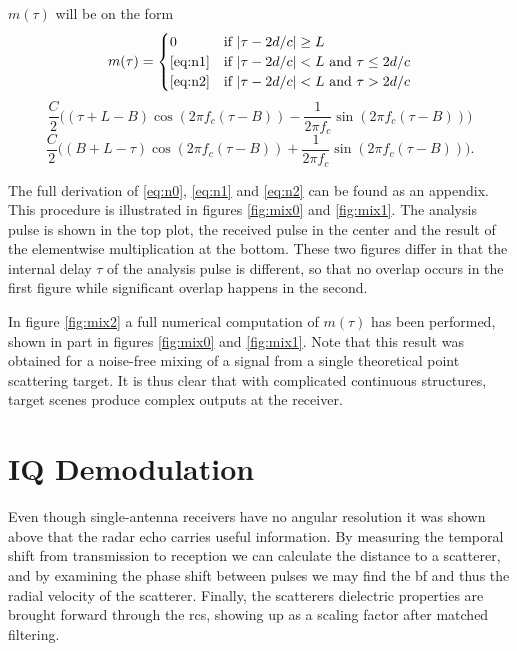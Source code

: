 \noindent $m(\tau)$ will be on the form 
\begin{equation}\label{eq:n0}
	m(\tau) = 
	\begin{cases}
		0 & \text{if $|\tau-2d/c|\geq L$} \\
		\text{\eqref{eq:n1}} & \text{if $|\tau-2d/c|<L$ and $\tau \leq 2d/c$} \\
		\text{\eqref{eq:n2}} & \text{if $|\tau-2d/c|<L$ and $\tau > 2d/c$}
	\end{cases}
\end{equation}
\begin{equation}\label{eq:n1}
	\frac{C}{2}\Big((\tau + L - B)\cos(2\pi f_c(\tau - B)) 
	- \frac{1}{2\pi f_c}\sin(2\pi f_c(\tau - B))\Big)
\end{equation}
\begin{equation}\label{eq:n2}
	\frac{C}{2}\Big((B + L - \tau)\cos(2\pi f_c(\tau - B)) 
	+ \frac{1}{2\pi f_c}\sin(2\pi f_c(\tau - B))\Big).
\end{equation}

The full derivation of \eqref{eq:n0}, \eqref{eq:n1} and \eqref{eq:n2} can be found as an appendix. This procedure is illustrated in figures \ref{fig:mix0} and \ref{fig:mix1}. The analysis pulse is shown in the top plot, the received pulse in the center and the result of the elementwise multiplication at the bottom. These two figures differ in that the internal delay $\tau$ of the analysis pulse is different, so that no overlap occurs in the first figure while significant overlap happens in the second.

In figure \ref{fig:mix2} a full numerical computation of $m(\tau)$ has been performed, shown in part in figures \ref{fig:mix0} and \ref{fig:mix1}. Note that this result was obtained for a noise-free mixing of a signal from a single theoretical point scattering target. It is thus clear that with complicated continuous structures, target scenes produce complex outputs at the receiver.

\section{IQ Demodulation}
\label{sec:iq}

Even though single-antenna receivers have no angular resolution it was shown above that the radar echo carries useful information. By measuring the temporal shift from transmission to reception we can calculate the distance to a scatterer, and by examining the phase shift between pulses we may find the \gls{bf} and thus the radial velocity of the scatterer. Finally, the scatterers dielectric properties are brought forward through the \gls{rcs}, showing up as a scaling factor after matched filtering. 

